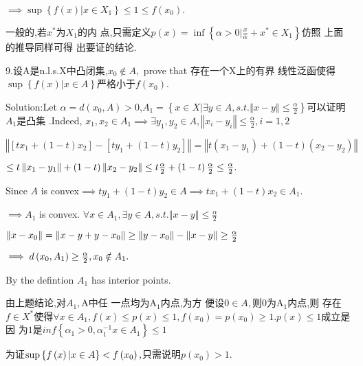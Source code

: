\documentclass{ctexart}
\begin{document}
$\implies \sup \left\{ f\left( x\right) |x\in X_{1}\right\} \leq 1\leq
f\left( x_{0}\right) .$

一般的,若$x^{\ast }$为$X_{1}$的内%
点,只需定义$p\left( x\right) =\inf \left\{
\alpha >0|\frac{x}{\alpha }+x^{\ast }\in X_{1}\right\} $仿照%
上面的推导同样可得%
出要证的结论.

9.设A是n.l.s.X中凸闭集,$x_{0}\notin A,$%
prove that 存在一个X上的有界%
线性泛函使得 $\sup \left\{ f\left(
x\right) |x\in A\right\} $严格小于$f\left(
x_{0}\right) $.

Solution:Let $\alpha =d\left( x_{0},A\right) >0$,$A_{1}=\left\{ x\in
X|\exists y\in A,s.t.\left\Vert x-y\right\Vert \leq \frac{\alpha }{2}%
\right\} $可以证明$A_{1}$是凸集%
.Indeed, $x_{1},x_{2}\in A_{1}\implies \exists y_{1},y_{2}\in A,\left\Vert
x_{i}-y_{i}\right\Vert \leq \frac{\alpha }{2},i=1,2$

$\left\Vert \left[ tx_{1}+\left( 1-t\right) x_{2}\right] -\left[
ty_{1}+\left( 1-t\right) y_{2}\right] \right\Vert =\left\Vert t\left(
x_{1}-y_{1}\right) +\left( 1-t\right) \left( x_{2}-y_{2}\right) \right\Vert $

$\leq t\left\Vert x_{1}-y_{1}\right\Vert +\left( 1-t\right) \left\Vert
x_{2}-y_{2}\right\Vert \leq t\frac{\alpha }{2}+\left( 1-t\right) \frac{%
\alpha }{2}\leq \frac{\alpha }{2}.$

Since $A$ is convex$\implies ty_{1}+\left( 1-t\right) y_{2}\in A\implies
tx_{1}+\left( 1-t\right) x_{2}\in A_{1}.$

$\implies A_{1}$ is convex. $\forall x\in A_{1},\exists y\in
A,s.t.\left\Vert x-y\right\Vert \leq \frac{\alpha }{2}$

$\left\Vert x-x_{0}\right\Vert =\left\Vert x-y+y-x_{0}\right\Vert \geq
\left\Vert y-x_{0}\right\Vert -\left\Vert x-y\right\Vert \geq \frac{\alpha }{%
2}$

$\bigskip \implies d\left( x_{0},A_{1}\right) \geq \frac{\alpha }{2}%
,x_{0}\notin A_{1}.$

By the defintion $A_{1}$ has interior points.

由上题结论,对$A_{1},$A中任%
一点均为A$_{1}$内点,为方%
便设0$\in A,$则0为A$_{1}$内点,则%
存在$f\in X^{\ast }$使得$\forall x\in A_{1},f\left(
x\right) \leq p\left( x\right) \leq 1,f\left( x_{0}\right) =p\left(
x_{0}\right) \geq 1.p\left( x\right) \leq 1$成立是因%
为$1$是$inf\left\{ \alpha _{1}>0,\alpha _{1}^{-1}x\in
A_{1}\right\} \leq 1$

为证$\bigskip \sup \left\{ f\left( x\right) |x\in A\right\}
<f\left( x_{0}\right) ,$只需说明$p\left(
x_{0}\right) >1.$
\end{document}
